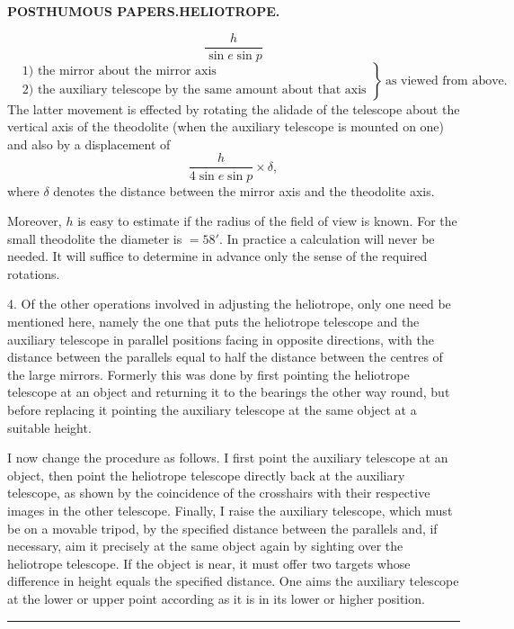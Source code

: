 \clearpage
\noindent{}\hfill{\small\textbf{POSTHUMOUS PAPERS.\quad HELIOTROPE.}}\hfill\null\par
\[
\frac{h}{\sin e\sin p}
\]
\[
\left.\begin{aligned}
&\text{1) the mirror about the mirror axis}\\
&\text{2) the auxiliary telescope by the same amount about that axis}
\end{aligned}\right\}\ \text{as viewed from above.}
\]
The latter movement is effected by rotating the alidade of the telescope
about the vertical axis of the theodolite (when the auxiliary telescope is
mounted on one) and also by a displacement of
\[
\frac{h}{4\sin e\sin p}\times\delta,
\]
where $\delta$ denotes the distance between the mirror axis and the theodolite axis.

Moreover, $h$ is easy to estimate if the radius of the field of view is known.
For the small theodolite the diameter is $=58'$. In practice a calculation
will never be needed. It will suffice to determine in advance only the sense
of the required rotations.

4. Of the other operations involved in adjusting the heliotrope, only one
need be mentioned here, namely the one that puts the heliotrope telescope
and the auxiliary telescope in parallel positions facing in opposite directions,
with the distance between the parallels equal to half the distance between
the centres of the large mirrors. Formerly this was done by first pointing
the heliotrope telescope at an object and returning it to the bearings the
other way round, but before replacing it pointing the auxiliary telescope
at the same object at a suitable height.

I now change the procedure as follows. I first point the auxiliary telescope
at an object, then point the heliotrope telescope directly back at the auxiliary telescope, as shown
by the coincidence of the crosshairs with their respective images in the
other telescope. Finally, I raise the auxiliary telescope, which must be on a
movable tripod, by the specified distance between the parallels and, if
necessary, aim it precisely at the same object again by sighting over the
heliotrope telescope. If the object is near, it must offer two targets whose
difference in height equals the specified distance. One aims the auxiliary
telescope at the lower or upper point according as it is in its lower or
higher position.
\begin{center}\rule{30mm}{.4pt}\end{center}

